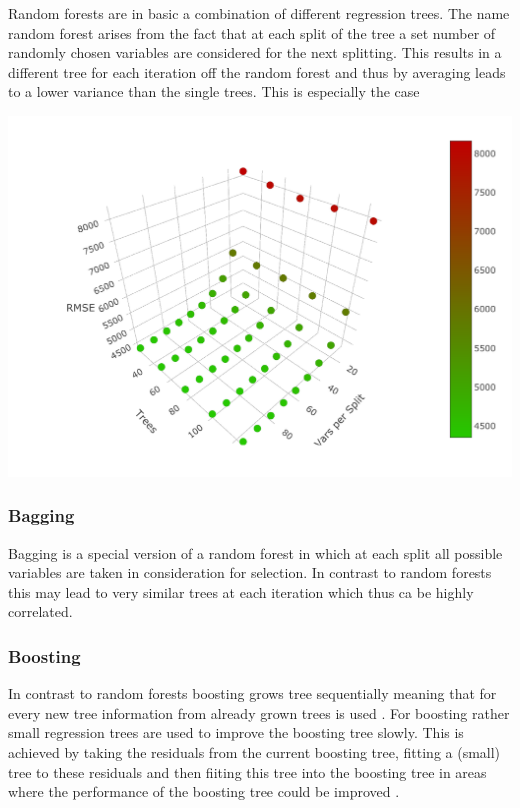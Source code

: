 \documentclass[11pt,]{article}
\begin{document}
Random forests are in basic a combination of different regression trees.
The name random forest arises from the fact that at each split of the
tree a set number of randomly chosen variables are considered for the
next splitting. This results in a different tree for each iteration off
the random forest and thus by averaging leads to a lower variance than
the single trees. This is especially the case

\includegraphics{../00_data/output_paper/10_rf_plot.pdf}

\hypertarget{bagging}{%
\subsubsection{Bagging}\label{bagging}}

Bagging is a special version of a random forest in which at each split
all possible variables are taken in consideration for selection. In
contrast to random forests this may lead to very similar trees at each
iteration which thus ca be highly correlated.

\hypertarget{boosting}{%
\subsubsection{Boosting}\label{boosting}}

In contrast to random forests boosting grows tree sequentially meaning
that for every new tree information from already grown trees is used
\autocite[p.322]{James2014}. For boosting rather small regression trees
are used to improve the boosting tree slowly. This is achieved by taking
the residuals from the current boosting tree, fitting a (small) tree to
these residuals and then fiiting this tree into the boosting tree in
areas where the performance of the boosting tree could be improved
\autocite[p.322]{James2014}.
\end{document}
